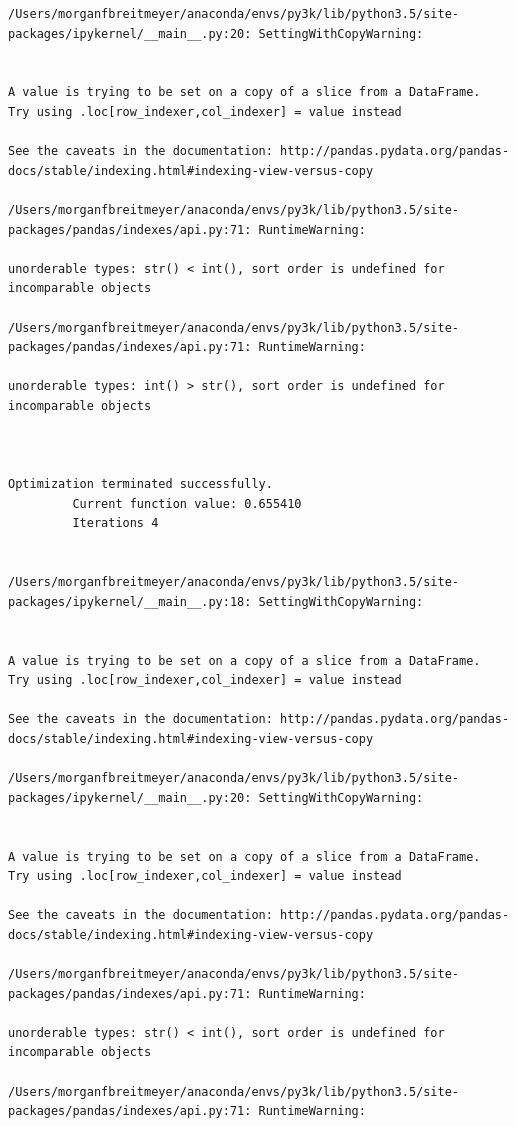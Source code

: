 \begin{lstlisting}
/Users/morganfbreitmeyer/anaconda/envs/py3k/lib/python3.5/site-packages/ipykernel/__main__.py:20: SettingWithCopyWarning:


A value is trying to be set on a copy of a slice from a DataFrame.
Try using .loc[row_indexer,col_indexer] = value instead

See the caveats in the documentation: http://pandas.pydata.org/pandas-docs/stable/indexing.html#indexing-view-versus-copy

/Users/morganfbreitmeyer/anaconda/envs/py3k/lib/python3.5/site-packages/pandas/indexes/api.py:71: RuntimeWarning:

unorderable types: str() < int(), sort order is undefined for incomparable objects

/Users/morganfbreitmeyer/anaconda/envs/py3k/lib/python3.5/site-packages/pandas/indexes/api.py:71: RuntimeWarning:

unorderable types: int() > str(), sort order is undefined for incomparable objects



Optimization terminated successfully.
         Current function value: 0.655410
         Iterations 4


/Users/morganfbreitmeyer/anaconda/envs/py3k/lib/python3.5/site-packages/ipykernel/__main__.py:18: SettingWithCopyWarning:


A value is trying to be set on a copy of a slice from a DataFrame.
Try using .loc[row_indexer,col_indexer] = value instead

See the caveats in the documentation: http://pandas.pydata.org/pandas-docs/stable/indexing.html#indexing-view-versus-copy

/Users/morganfbreitmeyer/anaconda/envs/py3k/lib/python3.5/site-packages/ipykernel/__main__.py:20: SettingWithCopyWarning:


A value is trying to be set on a copy of a slice from a DataFrame.
Try using .loc[row_indexer,col_indexer] = value instead

See the caveats in the documentation: http://pandas.pydata.org/pandas-docs/stable/indexing.html#indexing-view-versus-copy

/Users/morganfbreitmeyer/anaconda/envs/py3k/lib/python3.5/site-packages/pandas/indexes/api.py:71: RuntimeWarning:

unorderable types: str() < int(), sort order is undefined for incomparable objects

/Users/morganfbreitmeyer/anaconda/envs/py3k/lib/python3.5/site-packages/pandas/indexes/api.py:71: RuntimeWarning:


\end{lstlisting}
